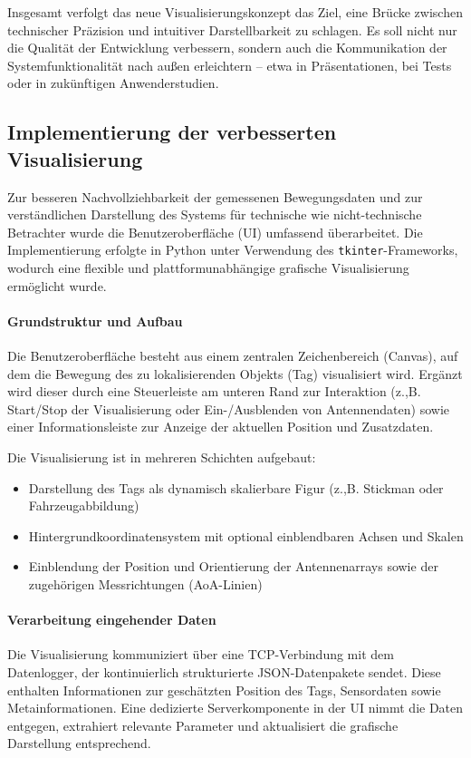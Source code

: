 \documentclass[a4paper, 12pt]{article} %
\begin{document}
Insgesamt verfolgt das neue Visualisierungskonzept das Ziel, eine Brücke zwischen technischer Präzision und intuitiver Darstellbarkeit zu schlagen. 
Es soll nicht nur die Qualität der Entwicklung verbessern, sondern auch die Kommunikation der Systemfunktionalität nach außen erleichtern – etwa in 
Präsentationen, bei Tests oder in zukünftigen Anwenderstudien.

\subsection{Implementierung der verbesserten Visualisierung}
Zur besseren Nachvollziehbarkeit der gemessenen Bewegungsdaten und zur verständlichen Darstellung des Systems für technische wie nicht-technische 
Betrachter wurde die Benutzeroberfläche (UI) umfassend überarbeitet. Die Implementierung erfolgte in Python unter Verwendung des 
\texttt{tkinter}-Frameworks, wodurch eine flexible und plattformunabhängige grafische Visualisierung ermöglicht wurde.

\paragraph{Grundstruktur und Aufbau}

Die Benutzeroberfläche besteht aus einem zentralen Zeichenbereich (Canvas), auf dem die Bewegung des zu lokalisierenden Objekts (Tag) visualisiert wird. 
Ergänzt wird dieser durch eine Steuerleiste am unteren Rand zur Interaktion (z.,B. Start/Stop der Visualisierung oder Ein-/Ausblenden von Antennendaten) 
sowie einer Informationsleiste zur Anzeige der aktuellen Position und Zusatzdaten.

Die Visualisierung ist in mehreren Schichten aufgebaut:
\begin{itemize}
\item Darstellung des Tags als dynamisch skalierbare Figur (z.,B. Stickman oder Fahrzeugabbildung)
\item Hintergrundkoordinatensystem mit optional einblendbaren Achsen und Skalen
\item Einblendung der Position und Orientierung der Antennenarrays sowie der zugehörigen Messrichtungen (AoA-Linien)
\end{itemize}

\paragraph{Verarbeitung eingehender Daten}

Die Visualisierung kommuniziert über eine TCP-Verbindung mit dem Datenlogger, der kontinuierlich strukturierte JSON-Datenpakete sendet. Diese enthalten 
Informationen zur geschätzten Position des Tags, Sensordaten sowie Metainformationen. Eine dedizierte Serverkomponente in der UI nimmt die Daten entgegen,
 extrahiert relevante Parameter und aktualisiert die grafische Darstellung entsprechend.
\end{document}
